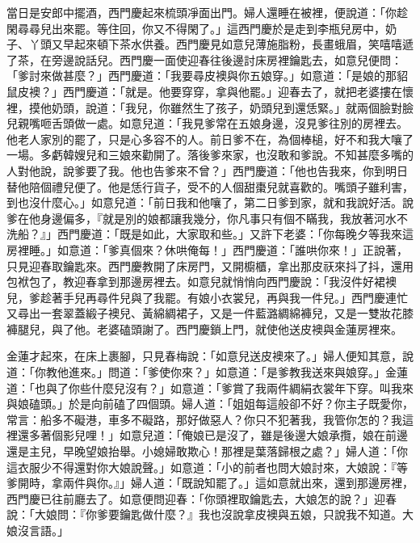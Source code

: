 當日是安郎中擺酒，西門慶起來梳頭凈面出門。婦人還睡在被裡，便說道：「你趁閑尋尋兒出來罷。等住回，你又不得閑了。」這西門慶於是走到李瓶兒房中，奶子、丫頭又早起來頓下茶水供養。西門慶見如意兒薄施脂粉，長畫蛾眉，笑嘻嘻遞了茶，在旁邊說話兒。西門慶一面使迎春往後邊討床房裡鑰匙去，如意兒便問：「爹討來做甚麼？」西門慶道：「我要尋皮襖與你五娘穿。」如意道：「是娘的那貂鼠皮襖？」西門慶道：「就是。他要穿穿，拿與他罷。」迎春去了，就把老婆摟在懷裡，摸他奶頭，說道：「我兒，你雖然生了孩子，奶頭兒到還恁緊。」就兩個臉對臉兒親嘴咂舌頭做一處。如意兒道：「我見爹常在五娘身邊，沒見爹往別的房裡去。他老人家別的罷了，只是心多容不的人。前日爹不在，為個棒槌，好不和我大嚷了一場。多虧韓嫂兒和三娘來勸開了。落後爹來家，也沒敢和爹說。不知甚麼多嘴的人對他說，說爹要了我。他也告爹來不曾？」西門慶道：「他也告我來，你到明日替他陪個禮兒便了。他是恁行貨子，受不的人個甜棗兒就喜歡的。嘴頭子雖利害，到也沒什麼心。」如意兒道：「前日我和他嚷了，第二日爹到家，就和我說好活。說爹在他身邊偏多，『就是別的娘都讓我幾分，你凡事只有個不瞞我，我放著河水不洗船？』」西門慶道：「既是如此，大家取和些。」又許下老婆：「你每晚夕等我來這房裡睡。」如意道：「爹真個來？休哄俺每！」西門慶道：「誰哄你來！」正說著，只見迎春取鑰匙來。西門慶教開了床房門，又開櫥櫃，拿出那皮祆來抖了抖，還用包袱包了，教迎春拿到那邊房裡去。如意兒就悄悄向西門慶說：「我沒件好裙襖兒，爹趁著手兒再尋件兒與了我罷。有娘小衣裳兒，再與我一件兒。」西門慶連忙又尋出一套翠蓋緞子襖兒、黃綿綢裙子，又是一件藍潞綢綿褲兒，又是一雙妝花膝褲腿兒，與了他。老婆磕頭謝了。西門慶鎖上門，就使他送皮襖與金蓮房裡來。

金蓮才起來，在床上裹腳，只見春梅說：「如意兒送皮襖來了。」婦人便知其意，說道：「你教他進來。」問道：「爹使你來？」如意道：「是爹教我送來與娘穿。」金蓮道：「也與了你些什麼兒沒有？」如意道：「爹賞了我兩件綢絹衣裳年下穿。叫我來與娘磕頭。」於是向前磕了四個頭。婦人道：「姐姐每這般卻不好？你主子既愛你，常言：船多不礙港，車多不礙路，那好做惡人？你只不犯著我，我管你怎的？我這裡還多著個影兒哩！」如意兒道：「俺娘已是沒了，雖是後邊大娘承攬，娘在前邊還是主兒，早晚望娘抬舉。小媳婦敢欺心！那裡是葉落歸根之處？」婦人道：「你這衣服少不得還對你大娘說聲。」如意道：「小的前者也問大娘討來，大娘說：『等爹開時，拿兩件與你。』」婦人道：「既說知罷了。」這如意就出來，還到那邊房裡，西門慶已往前廳去了。如意便問迎春：「你頭裡取鑰匙去，大娘怎的說？」迎春說：「大娘問：『你爹要鑰匙做什麼？』我也沒說拿皮襖與五娘，只說我不知道。大娘沒言語。」

